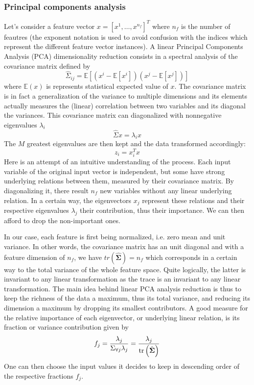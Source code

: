 \subsubsection{Principal components analysis}
Let's consider a feature vector $x = \left[x^1,\ldots,x^{n_f} \right]^T$ where $n_f$ is the number of feautres (the exponent notation is used to avoid confusion with the indices which represent the different feature vector instances). A linear Principal Components Analysis (PCA) dimensionality reduction consists in a spectral analysis of the covariance matrix defined by
\begin{equation}
    \hat{\Sigma}_{ij} = \mathbb{E}\left[\left(x^i - \mathbb{E}[x^i]\right)\left(x^j - \mathbb{E}[x^j]\right)\right]
\end{equation} 
where $\mathbb{E}(x)$ is represents statistical expected value of $x$. The covariance matrix is in fact a generalization of the variance to multiple dimensions and its elements actually measures the (linear) correlation between two variables and its diagonal the variances. This covariance matrix can diagonalized with nonnegative eigenvalues $\lambda_i$
\begin{equation}
\hat{\Sigma}x = \lambda_ix
\end{equation}
The $M$ greatest eigenvalues are then kept and the data transformed accordingly:
\begin{equation}
z_i = x_i^Tx
\end{equation}
Here is an attempt of an intuitive understanding of the process. Each input variable of the original input vector is independent, but some have strong underlying relations between them, measured by their covariance matrix. By diagonalizing it, there result $n_f$ new variables without any linear underlying relation. In a certain way, the eigenvectors $x_j$ represent these relations and their respective eigenvalues $\lambda_j$ their contribution, thus their importance. We can then afford to drop the non-important ones.

In our case, each feature is first being normalized, i.e. zero mean and unit variance. In other words, the covariance matrix has an unit diagonal and with a feature dimension of $n_f$, we have $tr(\hat{\mathbf{\Sigma}})=n_f$ which corresponds in a certain way to the total variance of the whole feature space. Quite logically, the latter is invariant to any linear transformation as the trace is an invariant to any linear transformation. The main idea behind linear PCA analysis reduction is thus to keep the richness of the data a maximum, thus its total variance, and reducing its dimension a maximum by dropping its smallest contributors. A good measure for the relative importance of each eigenvector, or underlying linear relation, is its fraction or variance contribution given by
\begin{equation}
f_j = \frac{\lambda_j}{\Sigma_{\forall j}\lambda_j} = \frac{\lambda_j}{\operatorname{tr}\left(\hat{\mathbf{\Sigma}}\right)}
\end{equation}
One can then choose the input values it decides to keep in descending order of the respective fractions $f_j$.

